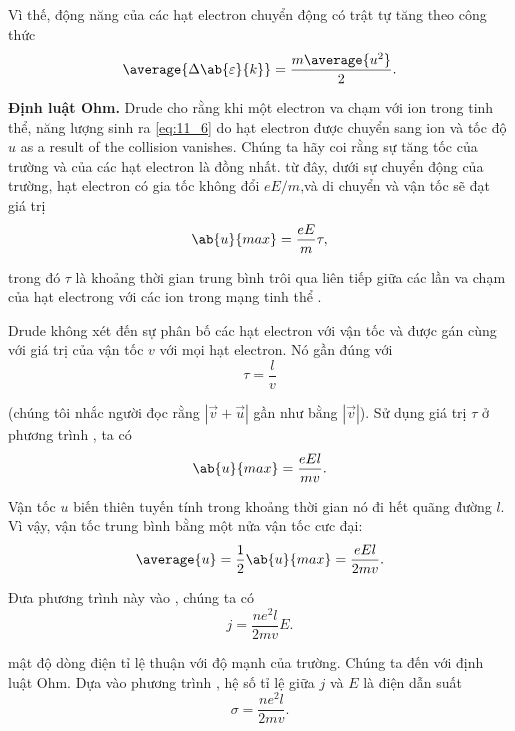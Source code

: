 \noindent
Vì thế, động năng của các hạt electron  chuyển động có trật tự tăng theo công thức
\begin{equation}\label{eq:11_6}
    \average{\Delta{\ab{\varepsilon}{k}}} = \frac{m\average{u^2}}{2}.
\end{equation}

\textbf{Định luật Ohm.} Drude cho rằng khi một electron va chạm với ion trong tinh thể, năng lượng sinh ra \eqref{eq:11_6} do hạt electron được chuyển sang ion và tốc độ $u$ as a result of the collision vanishes.
Chúng ta hãy coi rằng sự tăng tốc của trường và của các hạt electron là đồng nhất.
từ đây, dưới sự chuyển động của trường, hạt electron có gia tốc không đổi  $eE/m$,và di chuyển và vận tốc sẽ đạt giá trị
\begin{equation}\label{eq:11_7}
    \ab{u}{max} = \frac{eE}{m} \tau,
\end{equation}

\noindent
trong đó $\tau$ là khoảng thời gian trung bình trôi qua liên tiếp giữa các lần va chạm của hạt electrong với các ion trong mạng tinh thể .

Drude không xét đến sự phân bố các hạt electron với vận tốc và được gán cùng với giá trị của vận tốc $v$ với mọi hạt electron.
Nó gần đúng với
\begin{equation*}
    \tau = \frac{l}{v}
\end{equation*}

\noindent
(chúng tôi nhắc người đọc rằng $|\vec{v}+\vec{u}|$ gần như bằng $|\vec{v}|$).
Sử dụng giá trị $\tau$ ở phương trình , ta có
\begin{equation}\label{eq:11_8}
    \ab{u}{max} = \frac{eEl}{mv}.
\end{equation}

\noindent
Vận tốc $u$ biến thiên tuyến tính trong khoảng thời gian nó đi hết quãng đường  $l$.
Vì vậy, vận tốc trung bình bằng một nửa vận tốc cưc đại:
\begin{equation*}
    \average{u} = \frac{1}{2} \ab{u}{max} = \frac{eEl}{2mv}.
\end{equation*}

\noindent
Đưa phương trình này vào , chúng ta có
\begin{equation*}
    j = \frac{ne^2l}{2mv} E.
\end{equation*}

mật độ dòng điện tỉ lệ thuận với độ mạnh của trường.
Chúng ta đến với định luật Ohm.
Dựa vào phương trình , hệ số tỉ lệ giữa $j$ và $E$ là điện dẫn suất
\begin{equation}\label{eq:11_9}
    \sigma = \frac{ne^2l}{2mv}.
\end{equation}

